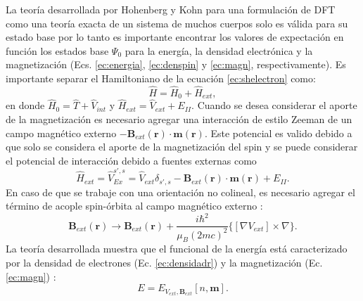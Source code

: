   La teor\'ia desarrollada por Hohenberg y Kohn \cite{HK-1964} para una formulaci\'on de DFT como una teor\'ia exacta de un sistema de muchos cuerpos  solo es v\'alida para su estado base por lo tanto  es importante encontrar los valores de expectaci\'on en funci\'on los estados base $\Psi_0$ para la energ\'ia, la densidad electr\'onica y la  magnetizaci\'on  (Ecs. \ref{ec:energia}, \ref{ec:denspin} y \ref{ec:magn}, respectivamente). Es importante separar el Hamiltoniano  de la ecuaci\'on \ref{ec:shelectron} como:
  \begin{equation}
  \hat{H} =\hat{H}_0 + \hat{H}_{ext}, \label{ec:sepHamilton}
  \end{equation}
  en donde $\hat{H}_0 = \hat{T}+\hat{V}_{int}$ y $\hat{H}_{ext}= \hat{V}_{ext} + E_{II}$.  Cuando se desea considerar el aporte de la magnetizaci\'on es necesario agregar una interacci\'on de estilo Zeeman de un campo magn\'etico externo 
  $-\pmb{B}_{ext} (\pmb{r}) \cdot \pmb{m} (\pmb{r}).$\cite{Martin-2004} 
  Este potencial es valido debido a que solo se considera el aporte de la magnetizaci\'on del spin y se puede considerar el potencial de interacci\'on debido a fuentes externas \cite{MB-2015, Martin-2004} como 
  \begin{equation}
  \hat{H}_{ext} = \hat{V}_{Ex}^{s', s} = \hat{V}_{ext} \delta_{s',s} - \pmb{B}_{ext} (\pmb{r})\cdot \pmb{m} (\pmb{r}) +E_{II}. \label{ec:intExt}
  \end{equation}
  En caso de que se trabaje con una orientaci\'on no colineal, es necesario agregar el t\'ermino de acople spin-\'orbita al campo magn\'etico externo \cite{MB-2015}:
  \begin{equation}
  \pmb{B}_{ext} (\pmb{r}) \to  \pmb{B}_{ext} (\pmb{r}) + \frac{i \hbar^2}{\mu_{B} (2 m c)^2} \{[\nabla V_{ext}]\times \nabla \}.
  \label{ec:Spinorb}\end{equation}
  \newline
  La teor\'ia desarrollada muestra que el funcional de la energ\'ia est\'a caracterizado por la densidad de electrones (Ec. \ref{ec:densidadr}) y la magnetizaci\'on (Ec. \ref{ec:magn}) \cite{PhysRevB.37.10685}:
  \begin{equation}
  E=E_{V_{ext}, \pmb{B}_{ext}} [n,\pmb{m}]. \label{ec:func1}
  \end{equation}
\newline
